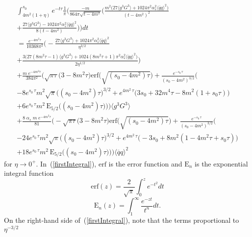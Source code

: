 \documentclass[11pt, letterpaper]{article}
\newcommand{\dif}[1]{d #1}
\newcommand{\glueSixD}{\big\langle g^{3} G^{3} \big\rangle}
\begin{document}
\begin{multline}\label{firstIntegral}
  \int_{4m^2(1+\eta)}^{s_0}e^{-t\tau}\frac{1}{\pi}
    \Bigg(\frac{-m}{864\pi\sqrt{t-4m^2}} \bigg(
  \frac{m^2 \Big(27 \glueSixD + 1024 \pi^2 \alpha_s^2 \big\langle \overline{q}q \big\rangle^2 \Big)}{(t-4m^2)^2}\\
 + \frac{27 \glueSixD - 1024 \pi^2 \alpha_s^2 \big\langle \overline{q}q \big\rangle^2}{8(t-4m^2)}
  \bigg)\Bigg)
    \dif{t}
    \\
=\frac{e^{-4m^2 \tau}}{10368\pi^2}
  \Bigg(-\frac{27 \glueSixD + 1024 \pi^2 \alpha_s^2 \big\langle \overline{q}q \big\rangle^2}{\eta^{3/2}}\\
  +\frac{3\Big(27 (8m^2 \tau -1) \glueSixD + 1024 (8m^2 \tau +1) \pi^2 \alpha_s^2 \big\langle \overline{q}q \big\rangle^2 \Big)}{2 \eta^{1/2}} \Bigg)\\
 +\frac{m \; e^{-4m^2 \tau}}{384\pi^2}
  \Bigg(
  \sqrt{\pi\tau} \Big( 3 - 8m^2 \tau \Big) \mathrm{erf}\Big(\sqrt{(s_0-4m^2)\tau}\Big) + \frac{e^{-s_0 \, \tau}}{(s_0 - 4m^2)^{3/2}} \bigg( \\
  -8 e^{s_0 \, \tau} m^2 \sqrt{\pi} \big((s_0 - 4m^2) \tau \big)^{3/2} + e^{4m^2 \, \tau} \big( 3 s_0 +32 m^4 \tau -8 m^2 (1+s_0 \tau)\big) \\
  +6 e^{s_0 \, \tau} m^2 \, \mathrm{E}_{5/2}\big( (s_0 -4m^2) \tau \big)
  \bigg)
  \Bigg)\glueSixD \\
 +\frac{8 \; \alpha_s \; m \; e^{-4m^2 \tau}}{81}
  \Bigg(
- \sqrt{\pi\tau} \Big( 3 - 8m^2 \tau \Big) \mathrm{erf}\Big(\sqrt{(s_0-4m^2)\tau}\Big) + \frac{e^{-s_0 \, \tau}}{(s_0 - 4m^2)^{3/2}} \bigg( \\
  -24 e^{s_0 \, \tau} m^2 \sqrt{\pi} \big((s_0 - 4m^2) \tau \big)^{3/2} + e^{4m^2 \, \tau} \big( -3 s_0 +8 m^2 (1 - 4m^2 \tau +s_0 \tau)\big) \\
   +18 e^{s_0 \, \tau} m^2 \, \mathrm{E}_{5/2}\big( (s_0 -4m^2) \tau \big) 
  \bigg)
  \Bigg)\big\langle \overline{q}q \big\rangle^2
\end{multline}
%
for $\eta\rightarrow 0^{+}$. In~(\ref{firstIntegral}), 
$\mathrm{erf}$ is the error function and $\mathrm{E}_{n}$ is the exponential integral function
%
\begin{equation}
  \mathrm{erf}(z)=\frac{2}{\sqrt{\pi}}\int_0^z e^{-t^2}\dif{t}
\end{equation}
%
\begin{equation}
  \mathrm{E}_{n}(z)=\int_1^\infty \frac{e^{-z t}}{t^n}\dif{t}.
\end{equation}
%
On the right-hand side of~(\ref{firstIntegral}), note that the terms proportional to $\eta^{-3/2}$ 
\end{document}
